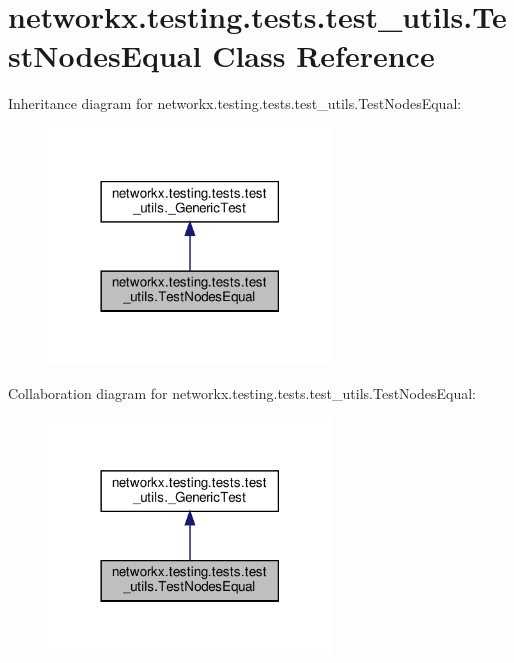 \hypertarget{classnetworkx_1_1testing_1_1tests_1_1test__utils_1_1TestNodesEqual}{}\section{networkx.\+testing.\+tests.\+test\+\_\+utils.\+Test\+Nodes\+Equal Class Reference}
\label{classnetworkx_1_1testing_1_1tests_1_1test__utils_1_1TestNodesEqual}


Inheritance diagram for networkx.\+testing.\+tests.\+test\+\_\+utils.\+Test\+Nodes\+Equal\+:
\nopagebreak
\begin{figure}[H]
\begin{center}
\leavevmode
\includegraphics[width=213pt]{classnetworkx_1_1testing_1_1tests_1_1test__utils_1_1TestNodesEqual__inherit__graph}
\end{center}
\end{figure}


Collaboration diagram for networkx.\+testing.\+tests.\+test\+\_\+utils.\+Test\+Nodes\+Equal\+:
\nopagebreak
\begin{figure}[H]
\begin{center}
\leavevmode
\includegraphics[width=213pt]{classnetworkx_1_1testing_1_1tests_1_1test__utils_1_1TestNodesEqual__coll__graph}
\end{center}
\end{figure}
